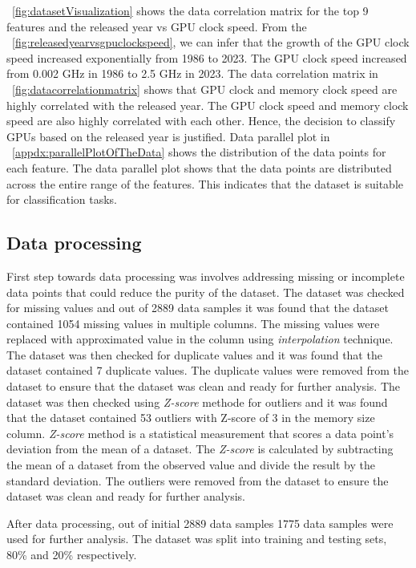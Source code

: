 \documentclass[conference,onecolumn]{IEEEtran}
\begin{document}
    \figurename~\ref{fig:datasetVisualization} shows the data correlation matrix for the top 9 features and the released year vs GPU clock speed. From the \figurename~\ref{fig:releasedyearvsgpuclockspeed}, we can infer that the growth of the GPU clock speed increased exponentially from 1986 to 2023. The GPU clock speed increased from 0.002 GHz in 1986 to 2.5 GHz in 2023. The data correlation matrix in \figurename~\ref{fig:datacorrelationmatrix} shows that  GPU clock and memory clock speed are highly correlated with the released year. The GPU clock speed and memory clock speed are also highly correlated with each other. Hence, the decision to classify GPUs based on the released year is justified. Data parallel plot in \appendixname~\ref{appdx:parallelPlotOfTheData} shows the distribution of the data points for each feature. The data parallel plot shows that the data points are distributed across the entire range of the features. This indicates that the dataset is suitable for classification tasks.

\subsection{Data processing}
    First step towards data processing was involves addressing missing or incomplete data points that could reduce the purity of the dataset. The dataset was checked for missing values and out of 2889 data samples it was found that the dataset contained 1054 missing values in multiple columns. The missing values were replaced with approximated value in the column using \emph{interpolation} technique. The dataset was then checked for duplicate values and it was found that the dataset contained 7 duplicate values. The duplicate values were removed from the dataset to ensure that the dataset was clean and ready for further analysis. The dataset was then checked using \emph{Z-score} methode for outliers and it was found that the dataset contained 53 outliers with Z-score of 3 in the memory size column. \emph{Z-score} method is a statistical measurement that scores a data point's deviation from the mean of a dataset. The \emph{Z-score} is calculated by subtracting the mean of a dataset from the observed value and divide the result by the standard deviation. The outliers were removed from the dataset to ensure the dataset was clean and ready for further analysis.

    After data processing, out of initial 2889 data samples 1775 data samples were used for further analysis. The dataset was split into training and testing sets, 80\% and 20\% respectively.
\end{document}
